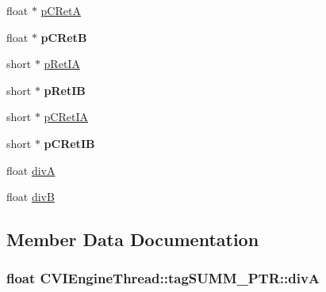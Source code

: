 \begin{DoxyCompactItemize}
\item 
float $\ast$ \hyperlink{struct_c_v_i_engine_thread_1_1tag_s_u_m_m___p_t_r_ae3e71bc1d4abdddf03fc3e7173ba9de1}{p\+C\+Ret\+A}
\item 
\hypertarget{struct_c_v_i_engine_thread_1_1tag_s_u_m_m___p_t_r_a838a354e38f8425a01be7d6968df35ae}{float $\ast$ {\bfseries p\+C\+Ret\+B}}\label{struct_c_v_i_engine_thread_1_1tag_s_u_m_m___p_t_r_a838a354e38f8425a01be7d6968df35ae}

\item 
short $\ast$ \hyperlink{struct_c_v_i_engine_thread_1_1tag_s_u_m_m___p_t_r_aa12ab544bfc27755c26ac5c321fc1db1}{p\+Ret\+I\+A}
\item 
\hypertarget{struct_c_v_i_engine_thread_1_1tag_s_u_m_m___p_t_r_acaad033b31231530d0bcf82900935f5a}{short $\ast$ {\bfseries p\+Ret\+I\+B}}\label{struct_c_v_i_engine_thread_1_1tag_s_u_m_m___p_t_r_acaad033b31231530d0bcf82900935f5a}

\item 
short $\ast$ \hyperlink{struct_c_v_i_engine_thread_1_1tag_s_u_m_m___p_t_r_ae70b246b8b7b3ed620dab1b0ef05a4cb}{p\+C\+Ret\+I\+A}
\item 
\hypertarget{struct_c_v_i_engine_thread_1_1tag_s_u_m_m___p_t_r_aaa56bf06649601e5435f12493606b8bf}{short $\ast$ {\bfseries p\+C\+Ret\+I\+B}}\label{struct_c_v_i_engine_thread_1_1tag_s_u_m_m___p_t_r_aaa56bf06649601e5435f12493606b8bf}

\item 
float \hyperlink{struct_c_v_i_engine_thread_1_1tag_s_u_m_m___p_t_r_a47e9d40cf2c8b3ea06664f16db1a6c1b}{div\+A}
\item 
float \hyperlink{struct_c_v_i_engine_thread_1_1tag_s_u_m_m___p_t_r_a01008dd478175bacaab9f9751a04c551}{div\+B}
\end{DoxyCompactItemize}


\subsection{Member Data Documentation}
\hypertarget{struct_c_v_i_engine_thread_1_1tag_s_u_m_m___p_t_r_a47e9d40cf2c8b3ea06664f16db1a6c1b}{
\subsubsection[{div\+A}]{\setlength{\rightskip}{0pt plus 5cm}float C\+V\+I\+Engine\+Thread\+::tag\+S\+U\+M\+M\+\_\+\+P\+T\+R\+::div\+A}}\label{struct_c_v_i_engine_thread_1_1tag_s_u_m_m___p_t_r_a47e9d40cf2c8b3ea06664f16db1a6c1b}





